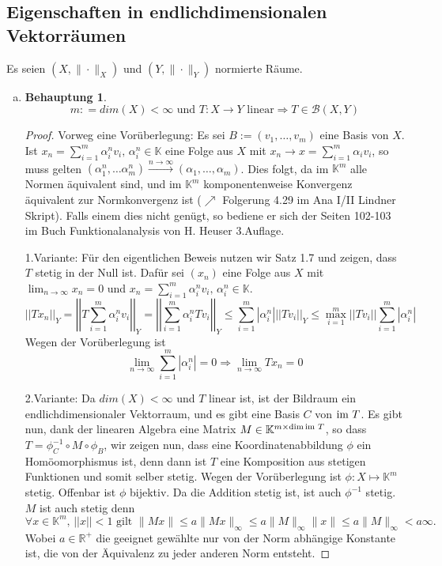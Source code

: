 \documentclass[ngerman]{article}
\theoremstyle{definition}%
\newtheorem*{beh}{Behauptung}
\newcommand{\R}{\mathbb{R}}
\newcommand{\K}{\mathbb{K}}
\newcommand{\B}{\mathcal{B}} %
\newcommand{\abs}[1]{\left\lvert #1 \right\rvert }
\newcommand{\norm}[1]{\left\lvert \left\lvert #1 \right\rvert \right\rvert}
\newcommand{\df}{\Rightarrow} %
\newcommand{\limes}[1][\infty]{\lim_{n \to #1}}
\newcommand{\im}{\textnormal{im }}
\renewcommand{\{ }{\left\lbrace}
\renewcommand{\}}{\right\rbrace}
\begin{document}
\subsection{Eigenschaften in endlichdimensionalen Vektorräumen}
Es seien $(X, \| \cdot \|_X)$ und $(Y, \| \cdot \|_Y)$ normierte Räume.
\begin{enumerate}[(a)]
\item

\begin{beh}
$$m: = dim(X) < \infty \text{ und } T:X\to Y \text{ linear}\df T \in \B(X,Y)$$
\end{beh}
\begin{proof}
	Vorweg eine Vorüberlegung: 
	Es sei $B:=(v_1,\dots,v_m)$ eine Basis von $X$. Ist $x_n = \sum^m_{i=1} \alpha^n_i v_i,\, \alpha^n_i \in \K$ eine Folge aus $X$ mit $x_n \to x = \sum^m_{i=1} \alpha_i v_i$, so muss gelten $(\alpha^n_1,\dots\alpha^n_m) \overset{n\to\infty}{\longrightarrow} (\alpha_1,\dots,\alpha_m)$. Dies folgt, da im $\K^m$ alle Normen äquivalent sind, und im $\K^m$ komponentenweise Konvergenz äquivalent zur Normkonvergenz ist ($\nearrow$ Folgerung 4.29 im Ana I/II Lindner Skript).
	Falls einem dies nicht genügt, so bediene er sich der Seiten 102-103 im Buch Funktionalanalysis von H. Heuser 3.Auflage.	
	\par\bigskip
	1.Variante:
	Für den eigentlichen Beweis nutzen wir Satz 1.7 und zeigen, dass $T$ stetig in der Null ist. 
	Dafür sei $(x_n)$ eine Folge aus $X$ mit $\limes x_n = 0$ und $x_n = \sum^m_{i=1} \alpha^n_i v_i,\, \alpha^n_i \in \K$.
	$$\norm{ Tx_n}_Y = \norm{ T \sum^m_{i=1} \alpha^n_i v_i }_Y = \norm{ \sum^m_{i=1} \alpha^n_i Tv_i}_Y \leq \sum^m_{i=1} \abs{\alpha^n_i} \norm{Tv_i}_Y \leq \max^m_{i=1} \norm{T v_i} \sum^m_{i=1} \abs{\alpha^n_i} $$
	Wegen der Vorüberlegung ist 
	$$\limes \sum^m_{i=1} \abs{\alpha^n_i} = 0 \df \limes Tx_n = 0$$\par\bigskip

	2.Variante:
Da $dim(X) <\infty$ und $T$ linear ist, ist der Bildraum ein endlichdimensionaler Vektorraum, und es gibt eine Basis $C$ von $\im T$. Es gibt nun, dank der linearen Algebra eine Matrix $M \in \K^{m\times \dim \im T}$, so dass $T = \phi^{-1}_C \circ M \circ \phi_B$, wir zeigen nun, dass eine Koordinatenabbildung $\phi$ ein Homöomorphismus ist, denn dann ist $T$ eine Komposition aus stetigen Funktionen und somit selber stetig.
Wegen der Vorüberlegung ist $\phi: X \mapsto \K^m$ stetig. Offenbar ist $\phi$ bijektiv.  Da die Addition stetig ist, ist auch $\phi^{-1}$ stetig.
$M$ ist auch stetig denn 
$$\forall x\in \K^m,\,\norm{x} < 1 \text{ gilt } \|Mx\|\leq a\|Mx\|_{\infty} \leq a\|M\|_{\infty} \|x\| \leq a\|M\|_{\infty} < a\infty.$$
Wobei $a\in\R^+$ die geeignet gewählte nur von der Norm abhängige Konstante ist, die von der Äquivalenz zu jeder anderen Norm entsteht.
\end{proof}


\end{enumerate}
\end{document}
